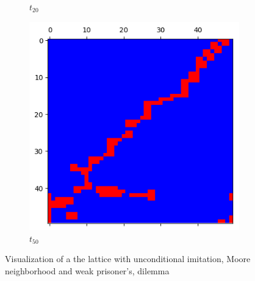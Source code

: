 \documentclass[letterpaper]{article}
\begin{document}
\begin{figure}
\begin{subfigure}{.3\textwidth}
      \caption{$t_{20}$}
      \label{fig:t20_50part1}
    \end{subfigure}
    \begin{subfigure}{.3\textwidth}
      \centering
      \includegraphics[width=1\linewidth]{images/assign2/visu_50-part1/t50}
      \caption{$t_{50}$}
      \label{fig:t50_50part1}
    \end{subfigure}
    \caption{Visualization of a the lattice with unconditional imitation,
    Moore neighborhood and weak prisoner's, dilemma}
    \label{fig:visu50part1}
\end{figure}
\end{document}
